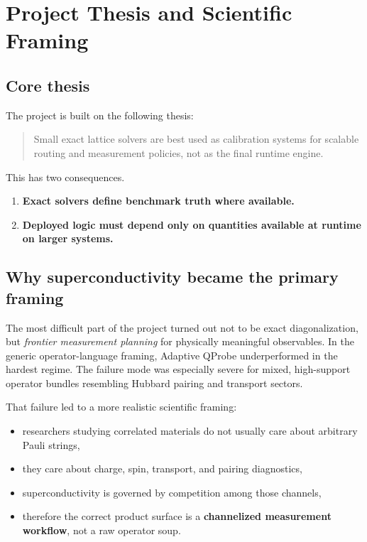 \documentclass[11pt]{article}
\begin{document}
\section{Project Thesis and Scientific Framing}

\subsection{Core thesis}

The project is built on the following thesis:

\begin{quote}
Small exact lattice solvers are best used as calibration systems for scalable routing and measurement policies, not as the final runtime engine.
\end{quote}

This has two consequences.

\begin{enumerate}[label=\arabic*.]
\item \textbf{Exact solvers define benchmark truth where available.}
\item \textbf{Deployed logic must depend only on quantities available at runtime on larger systems.}
\end{enumerate}

\subsection{Why superconductivity became the primary framing}

The most difficult part of the project turned out not to be exact diagonalization, but \emph{frontier measurement planning} for physically meaningful observables. In the generic operator-language framing, Adaptive QProbe underperformed in the hardest regime. The failure mode was especially severe for mixed, high-support operator bundles resembling Hubbard pairing and transport sectors.

That failure led to a more realistic scientific framing:

\begin{itemize}
\item researchers studying correlated materials do not usually care about arbitrary Pauli strings,
\item they care about charge, spin, transport, and pairing diagnostics,
\item superconductivity is governed by competition among those channels,
\item therefore the correct product surface is a \textbf{channelized measurement workflow}, not a raw operator soup.
\end{itemize}
\end{document}
